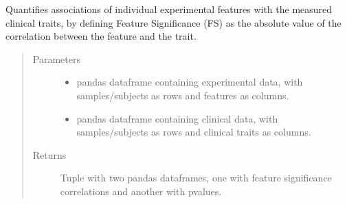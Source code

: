 \documentclass[letterpaper,10pt,english]{sphinxmanual}
\begin{document}
\begin{fulllineitems}
\label{\detokenize{_autosummary/analytics_core.analytics:analytics_core.analytics.wgcnaAnalysis.calculate_FeatureTraitSignificance}}
Quantifies associations of individual experimental features with the measured clinical traits, by defining Feature Significance (FS) as the absolute value of the correlation between the feature and the trait.
\begin{quote}\begin{description}
\item[{Parameters}] \leavevmode\begin{itemize}
\item {} 
 \textendash{} pandas dataframe containing experimental data, with samples/subjects as rows and features as columns.

\item {} 
 \textendash{} pandas dataframe containing clinical data, with samples/subjects as rows and clinical traits as columns.

\end{itemize}

\item[{Returns}] \leavevmode
Tuple with two pandas dataframes, one with feature significance correlations and another with p\sphinxhyphen{}values.

\end{description}\end{quote}

\end{fulllineitems}

\end{document}
